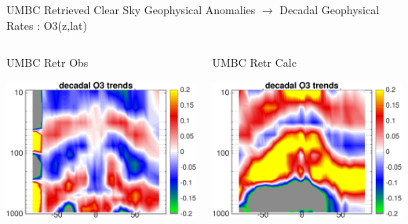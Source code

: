 \documentclass[10pt,t]{beamer}
\begin{document}
\begin{frame}{UMBC Retrieved Clear Sky Geophysical Anomalies $\rightarrow$ Decadal Geophysical Rates : O3(z,lat)}
\begin{columns}
\begin{column}{0.45\columnwidth}
\begin{block}{\footnotesize UMBC Retr Obs}
\vspace{-0.1in}
\begin{center}
\includegraphics[width=\linewidth]{Figs/ClearAnom/umbc_clr_retr_obs_o3_rate_200209_201808.png}
\end{center}
\end{block}
\end{column}

\begin{column}{0.45\columnwidth}
\begin{block}{\footnotesize UMBC Retr Calc}
\vspace{-0.1in}
\begin{center}
\includegraphics[width=\linewidth]{Figs/ClearAnom/umbc_clr_retr_cal_o3_rate_200209_201808.png}
\end{center}
\end{block}
\end{column}
\end{columns}

\end{frame}
\end{document}
